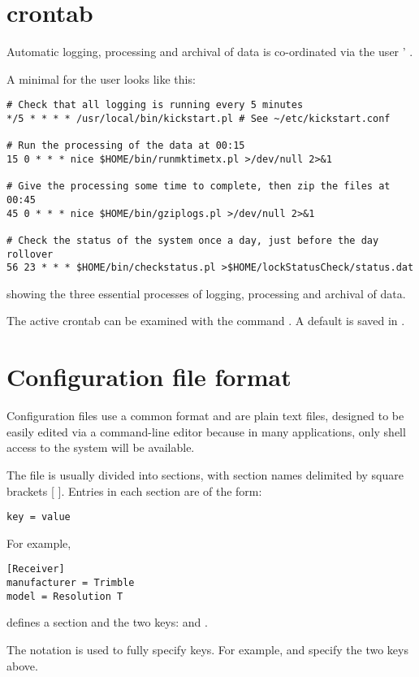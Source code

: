 \section{crontab \label{ss:crontab}}

Automatic logging, processing and archival of data is co-ordinated via the user ' .

A minimal  for the user  looks like this:
\begin{lstlisting}
# Check that all logging is running every 5 minutes
*/5 * * * * /usr/local/bin/kickstart.pl # See ~/etc/kickstart.conf

# Run the processing of the data at 00:15
15 0 * * * nice $HOME/bin/runmktimetx.pl >/dev/null 2>&1 

# Give the processing some time to complete, then zip the files at 00:45
45 0 * * * nice $HOME/bin/gziplogs.pl >/dev/null 2>&1

# Check the status of the system once a day, just before the day rollover
56 23 * * * $HOME/bin/checkstatus.pl >$HOME/lockStatusCheck/status.dat
\end{lstlisting}
showing the three essential processes of logging, processing and archival of data.

The active crontab can be examined with the command . 
A default  is saved in . 

\section{Configuration file format \label{sConfigFileFormat}}

Configuration files use a common format and are plain text files, designed to be easily edited via a command-line
editor because in many applications, only shell access to the system will be available.

The file is usually divided into sections, with section names delimited by square brackets [ ]. Entries in each section
are of the form:
\begin{lstlisting}
key = value
\end{lstlisting}
For example,
\begin{lstlisting}
[Receiver]
manufacturer = Trimble
model = Resolution T
\end{lstlisting}
defines a section  and the two keys:  and . 

The notation  is used to fully specify keys. For example,
 and  specify the two keys above.


